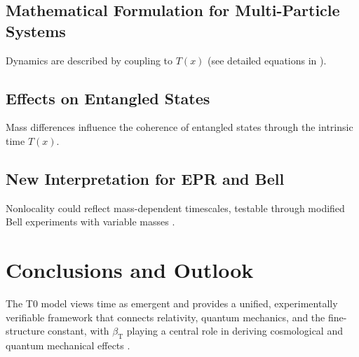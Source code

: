 \documentclass[12pt,a4paper]{article}
\newcommand{\Tfield}{T(x)}
\newcommand{\betaT}{\beta_{\text{T}}}
\begin{document}
	\subsection{Mathematical Formulation for Multi-Particle Systems}
	Dynamics are described by coupling to \(\Tfield\) (see detailed equations in \cite{pascher_lagrange_2025}).
	
	\subsection{Effects on Entangled States}
	Mass differences influence the coherence of entangled states through the intrinsic time \(\Tfield\).
	
	\subsection{New Interpretation for EPR and Bell}
	Nonlocality could reflect mass-dependent timescales, testable through modified Bell experiments with variable masses \cite{bell}.
	
	\section{Conclusions and Outlook}
	The T0 model views time as emergent and provides a unified, experimentally verifiable framework that connects relativity, quantum mechanics, and the fine-structure constant, with \(\betaT\) playing a central role in deriving cosmological and quantum mechanical effects \cite{pascher_galaxies_2025, pascher_alphabeta_2025}.
	
\end{document}
